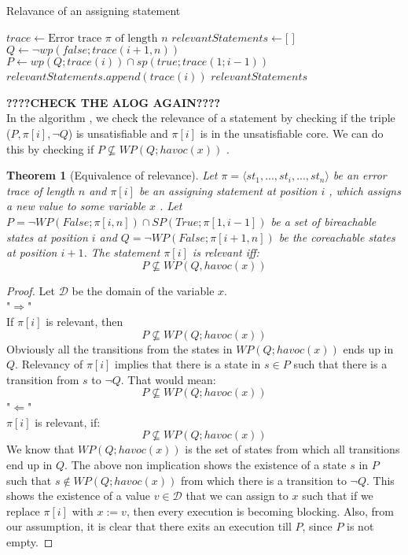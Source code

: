 \documentclass{article}
\newtheorem{theorem}{Theorem}
\begin{document}
\begin{algorithm}
\caption{Relavance of an assigning statement}\label{relevance}
\begin{algorithmic}[1]
\State $trace \gets \text{Error trace } \pi \text{ of length } \textit{n}$
\State $relevantStatements \gets \text{[ ]}$
\State $Q \gets \neg wp(false;trace(i+1,n))$
\State $P \gets wp(Q; trace(i)) \cap sp(true; trace(1;i-1))$
\State $relevantStatements.append(trace(i))$
\EndIf
\EndFor
\Return $relevantStatements$
\EndProcedure
\end{algorithmic}
\end{algorithm}
\textbf{????CHECK THE ALOG AGAIN????} \\
In the algorithm , we check the relevance of a statement by checking if the triple ($P,\pi[i],\neg Q$) is unsatisfiable and $\pi[i]$ is in the unsatisfiable core. We can do this by checking if $P \not \subseteq WP(Q; havoc(x))$ .
\begin{theorem}[Equivalence of relevance]\label{mydef:relevancytheorem}
Let $\pi = \langle st_1,...,st_i,...,st_n \rangle$ be an error trace of length $n$ and $\pi[i]$ be an assigning statement at position $i$ , which assigns a new value to some variable $x$ . Let $P = \neg WP(False; \pi[i,n]) \cap SP(True; \pi[1,i-1])$ be a set of bireachable states at position $i$ and $Q =  \neg WP(False; \pi[i+1,n])$ be the coreachable states at position $i+1$. The statement $\pi[i]$ is relevant iff:
 $$P \not \subseteq WP(Q,havoc(x))$$
\end{theorem}

\begin{proof}
Let $\mathcal{D}$ be the domain of the variable $x$. \\
"$\Rightarrow$"\\
If $\pi[i]$ is relevant, then\\
$$P \not \subseteq WP(Q;havoc(x))$$
Obviously all the transitions from the states in $WP(Q;havoc(x))$ ends up in $Q$. Relevancy of $\pi[i]$ implies that there is a state in $s \in P$ such that there is a transition from $s$ to $\neg Q$. That would mean:
$$P \not \subseteq WP(Q;havoc(x))$$
"$\Leftarrow$"\\
$\pi[i]$ is relevant, if:
$$P \not \subseteq WP(Q;havoc(x))$$
We know that $WP(Q;havoc(x))$ is the set of states from which all transitions end up in $Q$. The above non implication shows the existence of a state $s$ in $P$ such that $s \not \in WP(Q; havoc(x))$  from which there is a transition to $\neg Q$. This shows the existence of a value $v \in \mathcal{D}$ that we can assign to $x$ such that if we replace $\pi[i]$ with $x:=v$, then every execution is becoming blocking. Also, from our assumption, it is clear that there exits an execution till $P$, since $P$ is not empty.
\end{proof}
\end{document}
